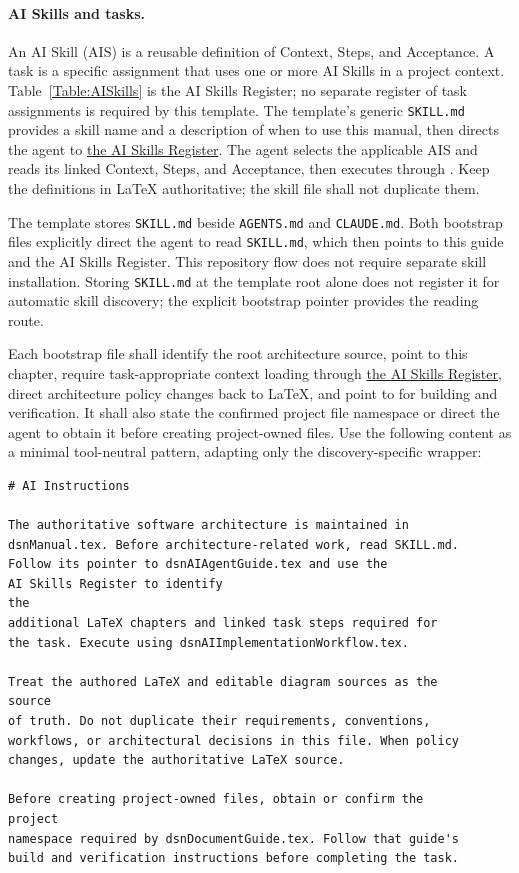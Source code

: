 \paragraph{AI Skills and tasks.}
An AI Skill (AIS) is a reusable definition of Context, Steps, and Acceptance.
A task is a specific assignment that uses one or more AI Skills in a project
context. Table~\ref{Table:AISkills} is the AI Skills Register; no separate
register of task assignments is required by this template.
The template's generic \texttt{SKILL.md} provides a skill name and a description
of when to use this manual, then directs the agent to
\hyperref[Table:AISkills]{the AI Skills Register}. The agent selects the
applicable AIS and reads its linked Context, Steps, and Acceptance, then
executes through . Keep the definitions
in LaTeX authoritative; the skill file shall not duplicate them.

The template stores \texttt{SKILL.md} beside \texttt{AGENTS.md} and
\texttt{CLAUDE.md}. Both bootstrap files explicitly direct the agent to read
\texttt{SKILL.md}, which then points to this guide and the AI Skills Register.
This repository flow does not require separate skill installation. Storing
\texttt{SKILL.md} at the template root alone does not register it for automatic
skill discovery; the explicit bootstrap pointer provides the reading route.

Each bootstrap file shall identify the root architecture source, point to this
chapter, require task-appropriate context loading through
\hyperref[Table:AISkills]{the AI Skills Register}, direct architecture
policy changes back to LaTeX, and point to  for
building and verification. It shall also state the confirmed project file
namespace or direct the agent to obtain it before creating project-owned files.
Use the following content as a minimal tool-neutral pattern, adapting only the
discovery-specific wrapper:

\begin{verbatim}
# AI Instructions

The authoritative software architecture is maintained in
dsnManual.tex. Before architecture-related work, read SKILL.md.
Follow its pointer to dsnAIAgentGuide.tex and use the
AI Skills Register to identify
the
additional LaTeX chapters and linked task steps required for
the task. Execute using dsnAIImplementationWorkflow.tex.

Treat the authored LaTeX and editable diagram sources as the
source
of truth. Do not duplicate their requirements, conventions,
workflows, or architectural decisions in this file. When policy
changes, update the authoritative LaTeX source.

Before creating project-owned files, obtain or confirm the
project
namespace required by dsnDocumentGuide.tex. Follow that guide's
build and verification instructions before completing the task.
\end{verbatim}

